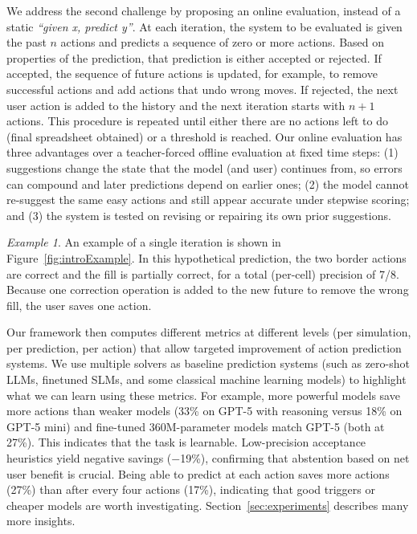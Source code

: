 \documentclass{article}
\theoremstyle{plain}
\theoremstyle{definition}
\theoremstyle{remark}
\newtheorem{example}{Example}
\begin{document}
We address the second challenge by proposing an online evaluation, instead of a static \emph{``given x, predict y''}.
At each iteration, the system to be evaluated is given the past $n$ actions and predicts a sequence of zero or more actions.
Based on properties of the prediction, that prediction is either accepted or rejected.
If accepted, the sequence of future actions is updated, for example, to remove successful actions and add actions that undo wrong moves.
If rejected, the next user action is added to the history and the next iteration starts with $n + 1$ actions.
This procedure is repeated until either there are no actions left to do (final spreadsheet obtained) or a threshold is reached.
Our online evaluation has three advantages over a teacher-forced offline evaluation at fixed time steps: (1) suggestions change the state that the model (and user) continues from, so errors can compound and later predictions depend on earlier ones; (2) the model cannot re-suggest the same easy actions and still appear accurate under stepwise scoring; and (3) the system is tested on revising or repairing its own prior suggestions.

\begin{example}
An example of a single iteration is shown in Figure~\ref{fig:introExample}.
In this hypothetical prediction, the two \textsf{\small border} actions are correct and the \textsf{\small fill} is partially correct, for a total (per-cell) precision of 7/8.
Because one correction operation is added to the new future to remove the wrong fill, the user saves one action.
\end{example}

Our framework then computes different metrics at different levels (per simulation, per prediction, per action) that allow targeted improvement of action prediction systems.
We use multiple solvers as baseline prediction systems (such as zero-shot LLMs, finetuned SLMs, and some classical machine learning models) to highlight what we can learn using these metrics.
For example, more powerful models save more actions than weaker models (33\% on GPT-5 with reasoning versus 18\% on GPT-5 mini) and fine-tuned 360M-parameter models match GPT-5 (both at 27\%).
This indicates that the task is learnable.
Low-precision acceptance heuristics yield negative savings ($-$19\%), confirming that abstention based on net user benefit is crucial.
Being able to predict at each action saves more actions (27\%) than after every four actions (17\%), indicating that good triggers or cheaper models are worth investigating.
Section~\ref{sec:experiments} describes many more insights.
\end{document}

